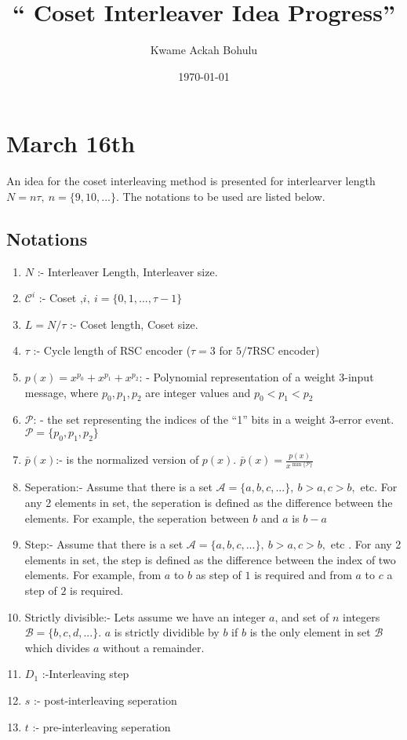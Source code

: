 \documentclass[11pt, oneside, dvipdfmx]{book}
\title{``
Coset Interleaver Idea Progress'' }
\author{Kwame Ackah Bohulu}
\date{\today}
\begin{document}
\maketitle




\section{March 16th}
An idea for the coset interleaving method is presented for interlearver length $N=n\tau,~n=\{9,10,...\}$. 
The notations to be used are listed below.

 \subsection{Notations}
 \begin{enumerate}
 \item $N$ :- Interleaver Length, Interleaver size.
  \item $\mathcal{C}^i$ :- Coset ,$i,~i=\{0,1,...,\tau-1 \}$
 \item $L=N/\tau$ :- Coset length, Coset size.
 \item $\tau$ :- Cycle length of RSC encoder ($\tau= 3$ for $5/7$RSC encoder)
 \item $p(x)=x^{p_0}+x^{p_1}+x^{p_2}$: - Polynomial representation of a weight 3-input message, where $p_0,p_1,p_2$ are integer values and $p_0<p_1<p_2$
 \item $\mathcal{P}$: - the set representing the indices of the ``1'' bits in a weight 3-error event. $\mathcal{P}= \{p_0,p_1,p_2\}$
 \item $\bar{p}(x)$:- is the normalized version of $p(x)$. $\bar{p}(x)=\frac{p(x)}{x^{\min\{\mathcal{P} \}}}$
 \item Seperation:- Assume that there is a set $\mathcal{A}=\{a,b,c,...\},~b>a,c>b,$ etc. For any 2 elements in set, the seperation is defined as the difference between the elements. For example, the seperation between $b$ and $a$ is $b-a$
 \item Step:- Assume that there is a set $\mathcal{A}=\{a,b,c,...\},~b>a,c>b,$ etc . For any 2 elements in set, the step is defined as the difference between the index of two elements. For example, from $a$ to $b$ as step of $1$ is required and from $a$ to $c$ a step of $2$ is required.
 \item Strictly divisible:- Lets assume we have an integer $a$, and  set of $n$ integers $\mathcal{B}=\{b,c,d,...\}$. $a$ is strictly dividible by $b$ if $b$ is the only element in set $\mathcal{B}$ which divides $a$ without a remainder.
 \item $D_1$ :-Interleaving step
 \item $s$ :- post-interleaving seperation
 \item $t$ :- pre-interleaving seperation
 

 \end{enumerate}
 
\end{document}
